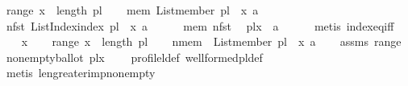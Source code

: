 \begin{isabellebody}
\ range{\isacharcolon}{\kern0pt}\ {\isachardoublequoteopen}x{}\ {\isacharless}{\kern0pt}\ length\ pl{\isachardoublequoteclose}\isanewline
\ \ \isamarkupfalse%
\ mem{\isacharcolon}{\kern0pt}\ {\isachardoublequoteopen}List{\isachardot}{\kern0pt}member\ {\isacharparenleft}{\kern0pt}pl\ {\isacharbang}{\kern0pt}\ x{}{\isacharparenright}{\kern0pt}\ a{\isachardoublequoteclose}\isanewline
\ \ \isamarkupfalse%
\ nfst{\isacharcolon}{\kern0pt}\ {\isachardoublequoteopen}List{\isacharunderscore}{\kern0pt}Index{\isachardot}{\kern0pt}index\ {\isacharparenleft}{\kern0pt}pl\ {\isacharbang}{\kern0pt}\ x{}{\isacharparenright}{\kern0pt}\ a\ {\isachargreater}{\kern0pt}\ {}{\isachardoublequoteclose}\isanewline
\ \ \isamarkupfalse%
\ mem\ nfst\ \isamarkupfalse%
\ {\isachardoublequoteopen}pl{\isacharbang}{\kern0pt}x{}{\isacharbang}{\kern0pt}{}\ {\isasymnoteq}\ a{\isachardoublequoteclose}\isanewline
\ \ \ \ \isamarkupfalse%
\ {\isacharparenleft}{\kern0pt}metis\ index{\isacharunderscore}{\kern0pt}eq{\isacharunderscore}{\kern0pt}iff{\isacharparenright}{\kern0pt}\isanewline
{}\isamarkupfalse%
\isanewline
\ \ \isamarkupfalse%
\ x{}\isanewline
\ \ \isamarkupfalse%
\ range{\isacharcolon}{\kern0pt}\ {\isachardoublequoteopen}x{}\ {\isacharless}{\kern0pt}\ length\ pl{\isachardoublequoteclose}\isanewline
\ \ \isamarkupfalse%
\ nmem{\isacharcolon}{\kern0pt}\ {\isachardoublequoteopen}{\isasymnot}\ List{\isachardot}{\kern0pt}member\ {\isacharparenleft}{\kern0pt}pl\ {\isacharbang}{\kern0pt}\ x{}{\isacharparenright}{\kern0pt}\ a{\isachardoublequoteclose}\isanewline
\ \ \isamarkupfalse%
\ assms\ range\ \isamarkupfalse%
\ nonempty{\isacharunderscore}{\kern0pt}ballot{\isacharcolon}{\kern0pt}\ {\isachardoublequoteopen}{\isacharparenleft}{\kern0pt}pl{\isacharbang}{\kern0pt}x{}{\isacharparenright}{\kern0pt}\ {\isasymnoteq}\ {\isacharbrackleft}{\kern0pt}{\isacharbrackright}{\kern0pt}{\isachardoublequoteclose}\ \isamarkupfalse%
\ profile{\isacharunderscore}{\kern0pt}l{\isacharunderscore}{\kern0pt}def\ well{\isacharunderscore}{\kern0pt}formed{\isacharunderscore}{\kern0pt}pl{\isacharunderscore}{\kern0pt}def\isanewline
\ \ \ \ \isamarkupfalse%
\ {\isacharparenleft}{\kern0pt}metis\ len{\isacharunderscore}{\kern0pt}greater{\isacharunderscore}{\kern0pt}imp{\isacharunderscore}{\kern0pt}nonempty{\isacharparenright}{\kern0pt}\isanewline

\end{isabellebody}
